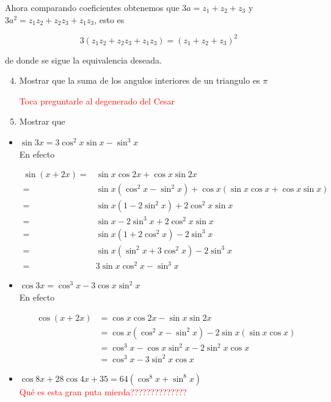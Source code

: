 \documentclass[11pt]{article}
\begin{document}
Ahora comparando coeficientes obtenemos que $3a=z_1+z_2+z_3$ y $3a^2=z_1z_2+z_2z_3+z_1z_3$, esto es 

$$3(z_1z_2+z_2z_3+z_1z_3)=(z_1+z_2+z_3)^2$$

de donde se sigue la equivalencia deseada.

\begin{enumerate}
  \setcounter{enumi}{3}
  \item Mostrar que la suma de los angulos interiores de un triangulo es $\pi$

\textcolor{red}{Toca preguntarle al degenerado del Cesar}

  \item Mostrar que
\end{enumerate}

\begin{itemize}
  \item $\sin 3 x=3 \cos ^{2} x \sin x-\sin ^{3} x$\\

En efecto

$$
\begin{aligned}
\sin (x+2 x)= & \sin x \cos 2 x+\cos x \sin 2 x \\
= & \sin x\left(\cos ^2 x-\sin ^2 x\right)+\cos x(\sin x \cos x+\cos x \sin x) \\
= & \sin x\left(1-2 \sin ^2 x\right)+2 \cos ^2 x \sin x \\
= & \sin x-2 \sin ^3 x+2 \cos ^2 x \sin x \\
= & \sin x\left(1+2 \cos ^2 x\right)-2 \sin ^3 x \\
= & \sin x\left(\sin ^2 x+3 \cos ^2 x\right)-2 \sin ^3 x \\
= & 3 \sin x \cos ^2 x-\sin ^3 x
\end{aligned}
$$

  \item $\cos 3 x=\cos ^{3} x-3 \cos x \sin ^{2} x$\\

  En efecto

  $$
\begin{aligned}
\cos (x+2 x) & =\cos x \cos 2 x-\sin x \sin 2 x \\
& =\cos x\left(\cos ^2 x-\sin ^2 x\right)-2 \sin x(\sin x \cos x) \\
& =\cos ^3 x-\cos x \sin ^2 x-2 \sin ^2 x \cos x \\
& =\cos ^3 x-3 \sin ^2 x \cos x
\end{aligned}
$$
  \item $\cos 8 x+28 \cos 4 x+35=64\left(\cos ^{8} x+\sin ^{8} x\right)$\\

\textcolor{red}{Qué es esta gran puta mierda??????????????}

\end{itemize}
\end{document}
